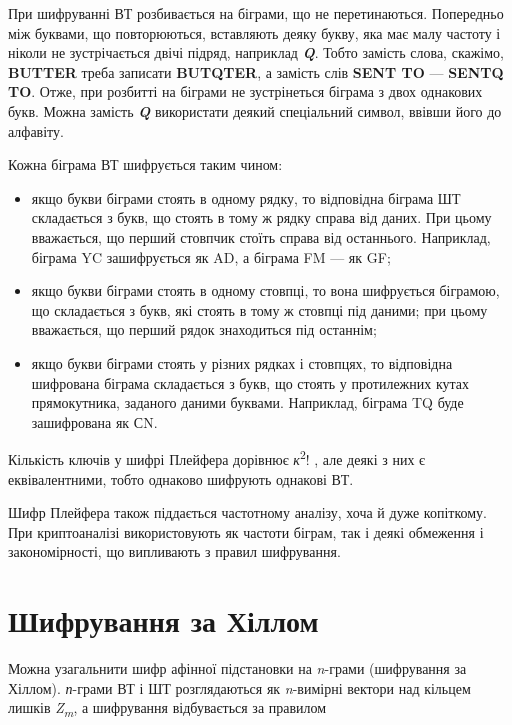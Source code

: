 {При шифруванні ВТ розбивається на біграми, що не перетинаються. Попередньо між
буквами, що повторюються, вставляють деяку букву, яка має малу частоту і ніколи
не зустрічається двічі підряд, наприклад \textbf{\textit{Q}}. Тобто замість
слова, скажімо, \textbf{BUTTER} треба записати \textbf{BUTQTER}, а замість слів
\textbf{SENT TO}  --- \textbf{SENTQ TO}. Отже, при розбитті на біграми не
зустрінеться біграма з двох однакових букв. Можна замість \textbf{\textit{Q
}}використати деякий спеціальний символ, ввівши його до алфавіту.

Кожна біграма ВТ шифрується таким чином:

\liststyleWWviiiNumxxx
\begin{itemize}
\item якщо букви біграми стоять в одному рядку, то відповідна біграма ШТ
складається з букв, що стоять в тому ж рядку справа від даних. При цьому
вважається, що перший стовпчик стоїть справа від останнього. Наприклад, біграма
YC зашифрується як AD, а біграма FM --- як GF;
\item якщо букви біграми стоять в одному стовпці, то вона шифрується біграмою,
що складається з букв, які стоять в тому ж стовпці під даними; при цьому
вважається, що перший рядок знаходиться під останнім;
\item якщо букви біграми стоять у різних рядках і стовпцях, то відповідна
шифрована біграма складається з букв, що стоять у протилежних кутах
прямокутника, заданого даними буквами. Наприклад, біграма TQ буде зашифрована
як СN.
\end{itemize}
Кількість ключів у шифрі Плейфера дорівнює \textit{к}\textsuperscript{2}!  , але
деякі з них є еквівалентними, тобто однаково шифрують однакові ВТ.

Шифр Плейфера також піддається частотному аналізу, хоча й дуже копіткому. При
криптоаналізі використовують як частоти біграм, так і деякі обмеження і
закономірності, що випливають з правил шифрування.


\bigskip


\bigskip

\section{Шифрування за Хіллом}


\bigskip


\bigskip

Можна узагальнити шифр афінної підстановки на \textit{n}{}-грами (шифрування за
Хіллом). \textit{п}{}-грами ВТ і ШТ розглядаються як \textit{n}{}-вимірні
вектори над кільцем лишків \textit{Z}\textit{\textsubscript{m}}, а шифрування
відбувається за правилом

}

